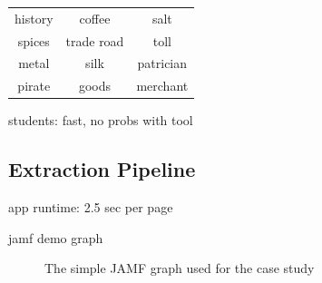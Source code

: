 \begin{table}
\label{t:seed}
\centering
{}
\begin{tabular}[h]{ccc}
        history
&        coffee 
&        salt \\
        spices 
&        trade road
&        toll \\
        metal
&        silk 
&        patrician \\
        pirate 
&        goods
&        merchant 
\end{tabular}
\end{table}

students: fast, no probs with tool

\subsection{Extraction Pipeline}

app runtime: 2.5 sec per page

jamf demo graph

\begin{figure}[h]
\centering
{}
\label{f:jamfgraph}
\caption{The simple JAMF graph used for the case study}
\end{figure}

